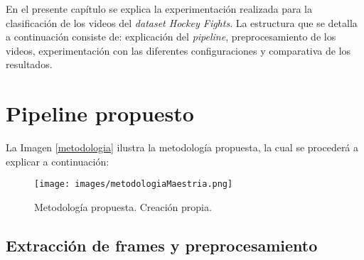 En el presente capítulo se explica la experimentación 
realizada para la clasificación de los videos del 
\textit{dataset Hockey Fights}. La 
estructura que se detalla a continuación consiste de: 
explicación del \textit{pipeline}, preprocesamiento de 
los videos, experimentación con las diferentes configuraciones 
y comparativa de los resultados.

\section{Pipeline propuesto}

La Imagen \ref{metodologia} ilustra la metodología propuesta, 
la cual se procederá a explicar a continuación:

\begin{figure}[h!] 
    \texttt{[image: images/metodologiaMaestria.png]} 
    \centering 
    \caption{Metodología propuesta. Creación propia.} 
    \label{convolucion} 
\end{figure}

\subsection{Extracción de frames y preprocesamiento}



